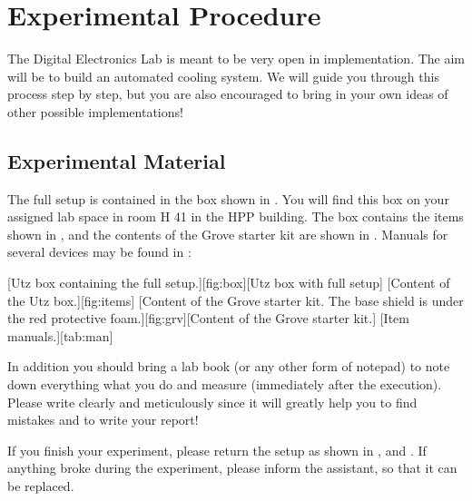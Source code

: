 \section{Experimental Procedure}\label{sec:exp}
The Digital Electronics Lab is meant to be very open in implementation. The aim will be to build an automated cooling system. We will guide you through this process step by step, but you are also encouraged to bring in your own ideas of other possible implementations!
%
\subsection{Experimental Material}\label{sec:material}
The full setup is contained in the box shown in . You will find this box on your assigned lab space in room H 41 in the HPP building. The box contains the items shown in , and the contents of the Grove starter kit are shown in . Manuals for several devices may be found in :\par
%
[Utz box containing the full setup.][fig:box][Utz box with full setup]
%
[Content of the Utz box.][fig:items]
%
[Content of the Grove starter kit. The base shield is under the red protective foam.][fig:grv][Content of the Grove starter kit.]
[Item manuals.][tab:man]
%
\begin{note}
  In addition you should bring a lab book (or any other form of notepad) to note down everything what you do and measure (immediately after the execution). Please write clearly and meticulously since it will greatly help you to find mistakes and to write your report! 
\end{note}
%
\begin{note}
  If you finish your experiment, please return the setup as shown in ,  and . If anything broke during the experiment, please inform the assistant, so that it can be replaced.
\end{note}
%
